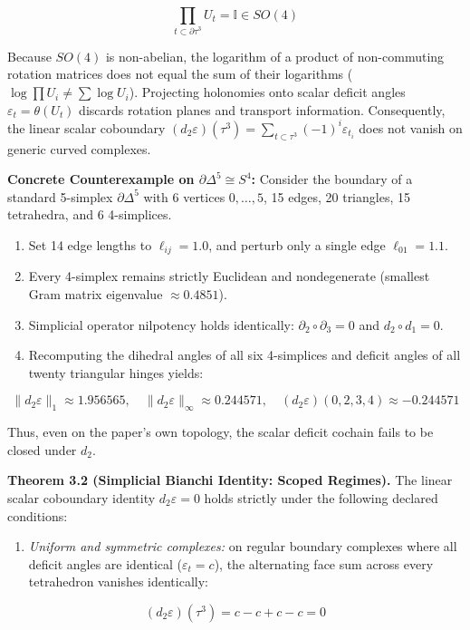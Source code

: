 \documentclass[11pt]{article}
\begin{document}
\begin{equation*}
\prod_{t \subset \partial \tau^3} U_t = \mathbb{I} \in SO(4)
\end{equation*}

Because $SO(4)$ is non-abelian, the logarithm of a product of non-commuting rotation matrices does not equal the sum of their logarithms ($\log \prod U_i \ne \sum \log U_i$). Projecting holonomies onto scalar deficit angles $\varepsilon_t = \theta(U_t)$ discards rotation planes and transport information. Consequently, the linear scalar coboundary $(d_2 \varepsilon)(\tau^3) = \sum_{t \subset \tau^3} (-1)^i \varepsilon_{t_i}$ does not vanish on generic curved complexes.

\textbf{Concrete Counterexample on $\partial \Delta^5 \cong S^4$:} Consider the boundary of a standard 5-simplex $\partial \Delta^5$ with 6 vertices $0, \dots, 5$, 15 edges, 20 triangles, 15 tetrahedra, and 6 4-simplices.

\begin{enumerate}[leftmargin=1.4em,itemsep=0.2em]
\item Set 14 edge lengths to $\ell_{ij} = 1.0$, and perturb only a single edge $\ell_{01} = 1.1$.
\item Every 4-simplex remains strictly Euclidean and nondegenerate (smallest Gram matrix eigenvalue $\approx 0.4851$).
\item Simplicial operator nilpotency holds identically: $\partial_2 \circ \partial_3 = 0$ and $d_2 \circ d_1 = 0$.
\item Recomputing the dihedral angles of all six 4-simplices and deficit angles of all twenty triangular hinges yields:
\end{enumerate}
\begin{equation*}
\|d_2 \varepsilon\|_1 \approx 1.956565, \quad \|d_2 \varepsilon\|_\infty \approx 0.244571, \quad (d_2 \varepsilon)(0,2,3,4) \approx -0.244571
\end{equation*}

Thus, even on the paper's own topology, the scalar deficit cochain fails to be closed under $d_2$.

\textbf{Theorem 3.2 (Simplicial Bianchi Identity: Scoped Regimes).} The linear scalar coboundary identity $d_2 \varepsilon = 0$ holds strictly under the following declared conditions:

\begin{enumerate}[leftmargin=1.4em,itemsep=0.2em]
\item \emph{Uniform and symmetric complexes:} on regular boundary complexes where all deficit angles are identical ($\varepsilon_t = c$), the alternating face sum across every tetrahedron vanishes identically:
\end{enumerate}
\begin{equation*}
   (d_2 \varepsilon)(\tau^3) = c - c + c - c = 0
\end{equation*}
\end{document}
